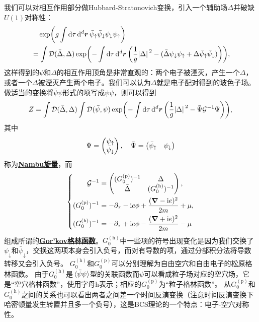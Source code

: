 \documentclass[hyperref, UTF8, a4paper]{ctexart}
\newcommand*{\ii}{\mathrm{i}}
\newcommand*{\fd}[1]{\mathcal{D}{#1}}
\newcommand{\concept}[1]{\underline{\textbf{#1}}}
\begin{document}
我们可以对相互作用部分做Hubbard-Stratonovich变换，引入一个辅助场$\Delta$并破缺$U(1)$对称性：
\[
    \begin{aligned}
        &\quad \exp(g \int \dd{\tau} \dd[d]{\vb*{r}} \bar{\psi}_\uparrow \bar{\psi}_\downarrow \psi_\downarrow \psi_\uparrow) \\
        &= \int \fd{(\bar{\Delta}, \Delta)} \exp(- \int \dd{\tau} \dd[d]{\vb*{r}} \left( \frac{1}{g} \abs*{\Delta}^2 - (\bar{\Delta} \psi_\downarrow \psi_\uparrow + \Delta \bar{\psi}_\uparrow \bar{\psi}_\downarrow) \right) ),
    \end{aligned}
\]
这样得到的$\psi$和$\Delta$的相互作用顶角是非常直观的：两个电子被湮灭，产生一个$\Delta$，或者一个$\Delta$被湮灭产生两个电子。我们可以认为$\Delta$就是电子配对得到的玻色子场。
做适当的变换将$\bar{\psi} \psi$形式的项写成$\psi \bar{\psi}$，则可以得到
\begin{equation}
    Z = \int \fd{(\bar{\Delta}, \Delta)} \int \fd{(\bar{\psi}, \psi)} \exp( - \int \dd{\tau} \dd[d]{\vb*{r}} \left( \frac{1}{g} \abs*{\Delta}^2 - \bar{\Psi} \mathcal{G}^{-1} \Psi \right) ),
\end{equation}
其中
\begin{equation}
    \Psi = \pmqty{\psi_\uparrow \\ \bar{\psi}_\downarrow}, \quad \bar{\Psi} = \pmqty{ \bar{\psi}_\uparrow & \psi_\downarrow }
\end{equation}
称为\concept{Nambu旋量}，而
\begin{equation}
    \left\{
        \begin{aligned}
            \mathcal{G}^{-1} &= \pmqty{(G^\text{(p)}_0)^{-1} & \Delta \\ \bar{\Delta} & (G^\text{(h)}_0)^{-1}}, \\
            (G^\text{(p)}_0)^{-1} &= - \partial_\tau - \ii e \phi + \frac{(\grad - \ii e)^2}{2m} + \mu, \\
            (G^\text{(h)}_0)^{-1} &= - \partial_\tau + \ii e \phi - \frac{(\grad + \ii e)^2}{2m} - \mu
        \end{aligned}
    \right.
\end{equation}
组成所谓的\concept{Gor'kov格林函数}。$G_0^{(\text{h})}$中一些项的符号出现变化是因为我们交换了$\psi_\downarrow$和$\bar{\psi}_\downarrow$，交换这两项本身会引入负号，而对有导数的项，通过分部积分法将导数转移又会引入负号。
$G_0^{(\text{h})}$和$G_0^{(\text{p})}$可以分别理解为自由空穴和自由电子的松原格林函数。
由于$G_0^{(\text{h})}$是$\expval*{\bar{\psi} \psi}$型的关联函数而$\psi$可以看成粒子场对应的空穴场，它是“空穴格林函数”，使用字母h表示；相应的$G_0^{(\text{p})}$为“粒子格林函数”。
从$G_0^{(\text{p})}$和$G_0^{(\text{h})}$之间的关系也可以看出两者之间差一个时间反演变换（注意时间反演变换下哈密顿量发生转置并且多一个负号），这是BCS理论的一个特点：电子-空穴对称性。
\end{document}
